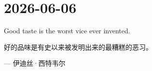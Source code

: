 \section*{2026-06-06}
Good taste is the worst vice ever invented. \par
好的品味是有史以来被发明出来的最糟糕的恶习。 \par
\hfill --- 伊迪丝·西特韦尔 \par
